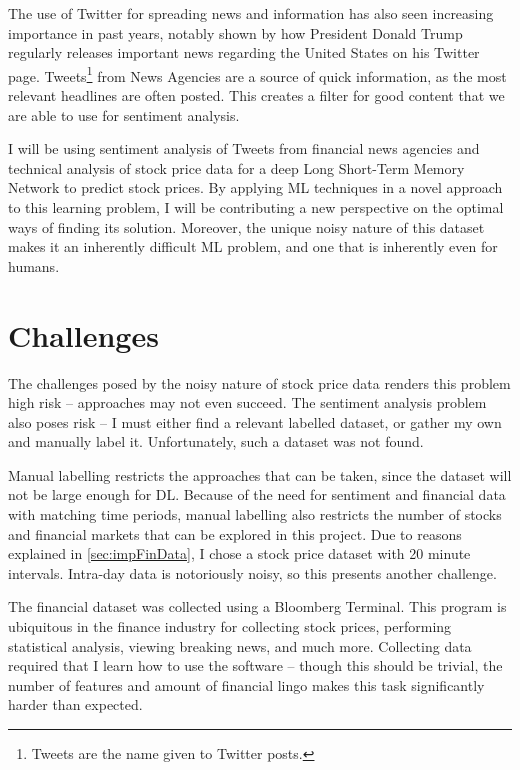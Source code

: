 \documentclass[12pt,a4paper,twoside,openright]{report}
\begin{document}
The use of Twitter for spreading news and information has also seen increasing importance in past years,
notably shown by how President Donald Trump regularly releases important news regarding the United States 
on his Twitter page. Tweets\footnote{Tweets are the name given to Twitter posts.} from News Agencies are
a source of quick information, as the most relevant headlines are often posted. This creates
a filter for good content that we are able to use for sentiment analysis.

I will be using sentiment analysis of Tweets from financial news agencies and technical analysis of stock
price data for a deep Long Short-Term Memory Network to predict stock prices.
By applying ML techniques in a novel approach to this learning problem,
I will be contributing a new perspective on the optimal ways of finding its solution. 
Moreover, the unique noisy nature of this
dataset makes it an inherently difficult ML problem, and one that is inherently
even for humans.

\section{Challenges}
\label{sec:introChallenges}

The challenges posed by the noisy nature of stock price data renders this problem
high risk -- approaches may not even succeed. The
sentiment analysis problem also poses risk -- I must either find a relevant labelled dataset,
or gather my own and manually label it. Unfortunately, such a dataset was not found.

Manual labelling restricts the approaches that
can be taken, since the dataset will not be large enough for DL.
Because of the need for sentiment and financial data with matching time periods, manual labelling
also restricts the number of stocks and financial markets that can be explored in this project. Due to reasons
explained in \cref{sec:impFinData}, I chose a stock price dataset with 20 minute intervals. Intra-day
data is notoriously noisy, so this presents another challenge.

The financial dataset was collected using a Bloomberg Terminal. This program is ubiquitous
in the finance industry for collecting stock prices, performing statistical analysis, viewing breaking news,
and much more. Collecting data required that I learn how to use the software --
though this should be trivial, the number of features and amount of
financial lingo makes this task significantly harder than expected.
\end{document}
